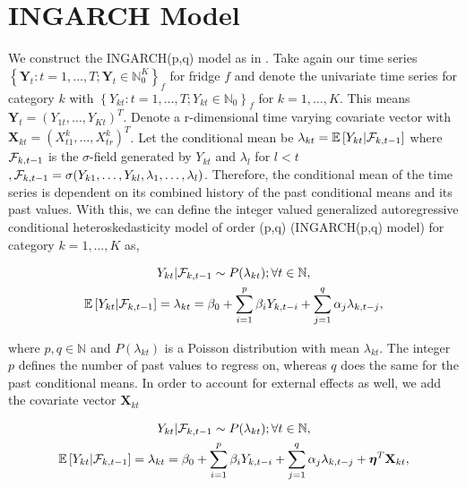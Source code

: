 \section{INGARCH Model}
\label{sec:Ingarch}

We construct the INGARCH(p,q) model as in \cite{Liboschik:2016}. 
Take again our time series $\left\{\bm{Y}_t:t=1,\ldots,T; \bm{Y}_t \in \mathbb{N}_0^K \right\}_f$ for fridge $f$ and denote the univariate time series for category $k$ with $\left\{Y_{kt}:t=1,\ldots,T; Y_{kt} \in \mathbb{N}_0\right\}_f$  for $k=1,\ldots,K$. This means $\bm{Y}_t = (Y_{1t},\ldots,Y_{Kt})^T$. Denote a r-dimensional time varying covariate vector with $\textbf{X}_{kt}=(X_{t1}^k,\ldots,X_{tr}^k)^T$. Let the conditional mean be $\lambda_{kt} = \mathbb{E}\left[Y_{kt} | \mathcal{F}_{k,t-1} \right]$ where $\mathcal{F}_{k,t-1}$ is the $\sigma$-field generated by $Y_{kt}$ and $\lambda_l$ for $l<t$ $, \mathcal{F} _{k,t-1}= \sigma(Y_{k1},\ldots,Y_{kl},\lambda_1, \ldots, \lambda_l)$. Therefore, the conditional mean of the time series is dependent on its combined history of the past conditional means and its past values. With this, we can define the integer valued generalized autoregressive conditional heteroskedasticity model of order (p,q) (INGARCH(p,q) model) for category $k=1,\ldots,K$ as,

\begin{gather}
\label{eq:Ingarch model}
Y_{kt} | \mathcal{F}_{k,t-1} \sim P(\lambda_{kt}); \forall t \in \mathbb{N}, \\
\mathbb{E}\left[Y_{kt} | \mathcal{F}_{k,t-1} \right] = \lambda_{kt} = \beta_0 + \sum_{i=1}^p\beta_i Y_{k,t-i} + \sum_{j=1}^q\alpha_j \lambda_{k,t-j},
\end{gather}

where $p,q \in \mathbb{N}$ and $P(\lambda_{kt})$ is a Poisson distribution with mean $\lambda_{kt}$. The integer $p$ defines the number of past values to regress on, whereas $q$ does the same for the past conditional means. In order to account for external effects as well, we add the covariate vector $\textbf{X}_{kt}$

\begin{gather}
\label{eq:Ingarch model with external effect}
Y_{kt} | \mathcal{F}_{k,t-1} \sim P(\lambda_{kt}); \forall t \in \mathbb{N}, \\
\mathbb{E}\left[Y_{kt} | \mathcal{F}_{k,t-1} \right] = \lambda_{kt} = \beta_0 + \sum_{i=1}^p\beta_i Y_{k,t-i} + \sum_{j=1}^q\alpha_j \lambda_{k,t-j} + \bm{\eta}^T\textbf{X}_{kt},
\end{gather}

